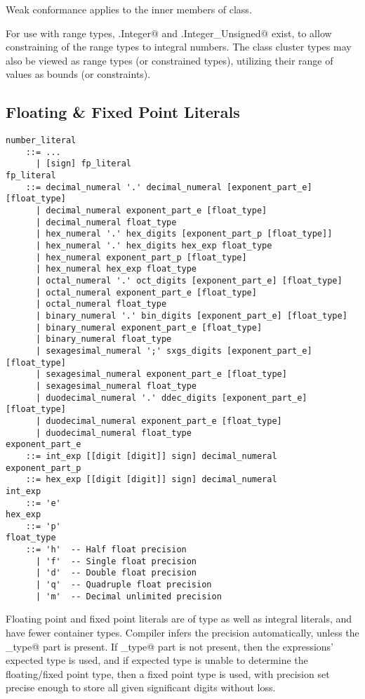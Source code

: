 Weak conformance applies to the inner members of \lstinline@Number@ class. 

For use with range types, \lstinline@Number.Integer@ and \lstinline@Number.Integer_Unsigned@ exist, to allow constraining of the range types to integral numbers. The class cluster types may also be viewed as range types (or constrained types), utilizing their range of values as bounds (or constraints). 






\subsection{Floating \& Fixed Point Literals}
\label{sec:floatliterals}
\label{sec:fixedpointliterals}

\syntax\begin{lstlisting}
number_literal
    ::= ...
      | [sign] fp_literal
fp_literal
    ::= decimal_numeral '.' decimal_numeral [exponent_part_e] [float_type]
      | decimal_numeral exponent_part_e [float_type]
      | decimal_numeral float_type
      | hex_numeral '.' hex_digits [exponent_part_p [float_type]]
      | hex_numeral '.' hex_digits hex_exp float_type
      | hex_numeral exponent_part_p [float_type]
      | hex_numeral hex_exp float_type
      | octal_numeral '.' oct_digits [exponent_part_e] [float_type]
      | octal_numeral exponent_part_e [float_type]
      | octal_numeral float_type
      | binary_numeral '.' bin_digits [exponent_part_e] [float_type]
      | binary_numeral exponent_part_e [float_type]
      | binary_numeral float_type
      | sexagesimal_numeral ';' sxgs_digits [exponent_part_e] [float_type]
      | sexagesimal_numeral exponent_part_e [float_type]
      | sexagesimal_numeral float_type
      | duodecimal_numeral '.' ddec_digits [exponent_part_e] [float_type]
      | duodecimal_numeral exponent_part_e [float_type]
      | duodecimal_numeral float_type
exponent_part_e 
    ::= int_exp [[digit [digit]] sign] decimal_numeral
exponent_part_p 
    ::= hex_exp [[digit [digit]] sign] decimal_numeral
int_exp 
    ::= 'e'
hex_exp 
    ::= 'p'
float_type 
    ::= 'h'  -- Half float precision
      | 'f'  -- Single float precision
      | 'd'  -- Double float precision
      | 'q'  -- Quadruple float precision
      | 'm'  -- Decimal unlimited precision
\end{lstlisting}

Floating point and fixed point literals are of type \lstinline@Number@ as well as integral literals, and have fewer container types. Compiler infers the precision automatically, unless the \lstinline@float_type@ part is present. If \lstinline@float_type@ part is not present, then the expressions' expected type is used, and if expected type is unable to determine the floating/fixed point type, then a fixed point type is used, with precision set precise enough to store all given significant digits without loss. 

